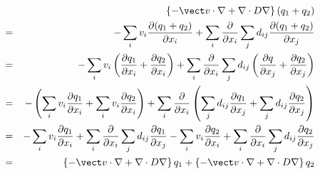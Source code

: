 \begin{eqnarray}
	& & \left \lbrace -\vect v \cdot \nabla + \nabla \cdot D \nabla \right \rbrace (q_1 + q_2) \\
	& = & - \sum_i v_i \frac{\partial (q_1+q_2)}{\partial x_i} + \sum_i \frac{\partial}{\partial x_i} \sum_j d_{ij} \frac{\partial (q_1+q_2)}{\partial x_j} \\
	& = & - \sum_i v_i \left ( \frac{\partial q_1}{\partial x_i} + \frac{\partial q_2}{\partial x_i} \right ) + \sum_i \frac{\partial}{\partial x_i} \sum_j d_{ij} \left ( \frac{\partial q}{\partial x_j} + \frac{\partial q_2}{\partial x_j} \right ) \\
	& = & - \left (\sum_i v_i \frac{\partial q_1}{\partial x_i} + \sum_i v_i \frac{\partial q_2}{\partial x_i} \right ) + \sum_i \frac{\partial}{\partial x_i} \left ( \sum_j d_{ij} \frac{\partial q_1}{\partial x_j} + \sum_j d_{ij} \frac{\partial q_2}{\partial x_j} \right ) \\
	& = & - \sum_i v_i \frac{\partial q_1}{\partial x_i} + \sum_i \frac{\partial}{\partial x_i} \sum_j d_{ij} \frac{\partial q_1}{\partial x_j} - \sum_i v_i \frac{\partial q_2}{\partial x_i} + \sum_i \frac{\partial}{\partial x_i} \sum_j d_{ij} \frac{\partial q_2}{\partial x_j} \\
	& = & \left \lbrace -\vect v \cdot \nabla + \nabla \cdot D \nabla \right \rbrace q_1 + \left \lbrace -\vect v \cdot \nabla + \nabla \cdot D \nabla \right \rbrace q_2
\end{eqnarray}


